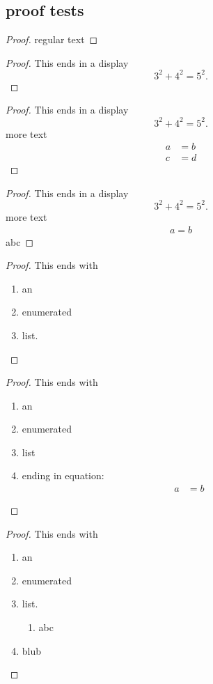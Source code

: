 \documentclass[leqno]{article}
\begin{document}
\subsection{proof tests}

\begin{proof}
regular text
\end{proof}

\begin{proof}
  This ends in a display
  \[
    3^2 + 4^2 = 5^2.
  \]
\end{proof}

\begin{proof}
  This ends in a display
  \[
    3^2 + 4^2 = 5^2.
  \]
more text
\begin{align}
a&=b \\
c&=d
\end{align}
\end{proof}

\begin{proof}
  This ends in a display
  \[
    3^2 + 4^2 = 5^2.
  \]
more text
\begin{align*}
a=b
\end{align*}
abc
\end{proof}

\begin{proof}
  This ends with
  \begin{enumerate}
  \item an
  \item enumerated
  \item list.
  \end{enumerate}
\end{proof}

\begin{proof}
  This ends with
  \begin{enumerate}
  \item an
  \item enumerated
  \item list
  \item ending in equation:
  \begin{align*}
  a&=b
  \end{align*}
  \end{enumerate}
\end{proof}

\begin{proof}
  This ends with
  \begin{enumerate}
  \item an
  \item enumerated
  \item list.
  \begin{enumerate}
  \item abc
  \end{enumerate}
  \item blub
  \end{enumerate}
\end{proof}
\end{document}
